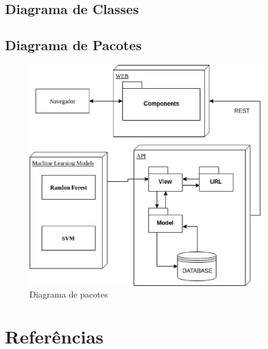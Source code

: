 \begin{anexosenv}
	\subsection{Diagrama de Classes}
	\subsection{Diagrama de Pacotes}
	\begin{figure}[!htb]
		\centering
		 \includegraphics[width=0.9\textwidth]{figuras/diagrama_pacotes.eps}
		 \caption{Diagrama de pacotes}
		 \label{diagramadepacotes}
	 \end{figure}

	\section{Referências}

\end{anexosenv}

